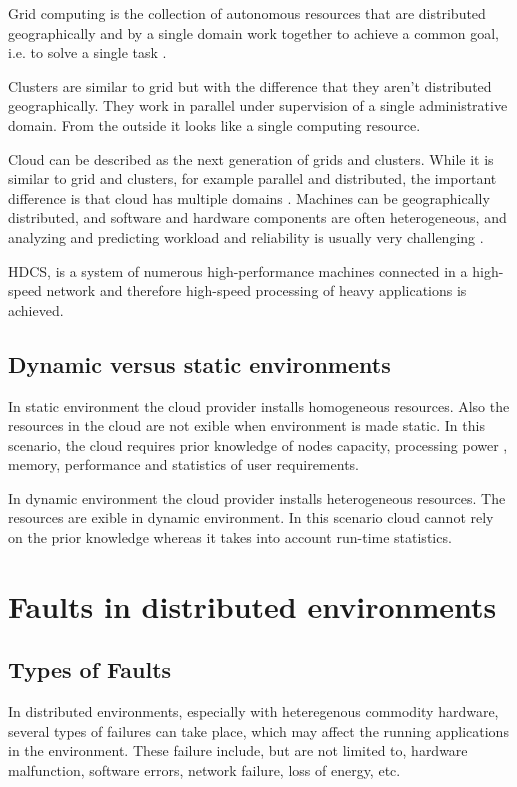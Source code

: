 \documentclass{cslthse-msc}
\begin{document}
Grid computing is the collection of autonomous resources that are distributed geographically and by a single domain work together to achieve a common goal, i.e. to solve a single task \cite{compStudyLoadAndCloud}.

Clusters are similar to grid but with the difference that they aren't distributed geographically. They work in parallel under supervision of a single administrative domain. From the outside it looks like a single computing resource. \cite{compStudyLoadAndCloud}

Cloud can be described as the next generation of grids and clusters. While it is similar to grid and clusters, for example parallel and distributed, the important difference is that cloud has multiple domains \cite{compStudyLoadAndCloud}. Machines can be geographically distributed, and software and hardware components are often heterogeneous, and analyzing and predicting workload and reliability is usually very challenging \cite{surveyReliabilityDistr}. 

HDCS, is a system of numerous high-performance machines connected in a high-speed network and therefore high-speed processing of heavy applications is achieved.

\subsection{Dynamic versus static environments}
In static environment the cloud provider installs homogeneous resources. Also the resources in the cloud are not  exible when environment is made static. In this scenario, the cloud requires prior knowledge of nodes capacity, processing power , memory, performance and statistics of user requirements.

In dynamic environment the cloud provider installs heterogeneous resources. The resources are  exible in dynamic environment. In this scenario cloud cannot rely on the prior knowledge whereas it takes into account run-time statistics. \cite{compStudyLoadAndCloud}



\section{Faults in distributed environments}
\subsection{Types of Faults}
In distributed environments, especially with heteregenous commodity hardware, several types of failures can take place, which may affect the running applications in the environment. These failure include, but are not limited to, hardware malfunction, software errors, network failure, loss of energy, etc.
\end{document}
